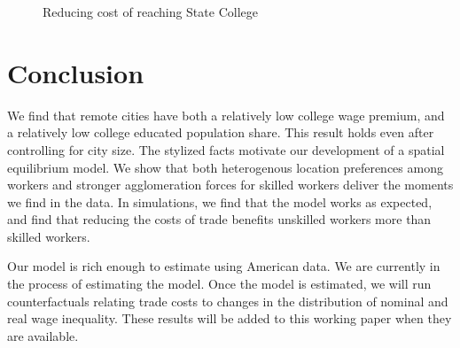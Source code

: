 \documentclass[12 pt]{article}
\begin{document}
\begin{figure}[ht!]

\centering
\caption{\label{fig:sim_res} Reducing cost of reaching State College}
\end{figure}

\section{Conclusion}

We find that remote cities have both a relatively low college wage premium, and a relatively low college educated population share.  This result holds even after controlling for city size.  The stylized facts motivate our development of a spatial equilibrium model.  We show that both heterogenous location preferences among workers and stronger agglomeration forces for skilled workers deliver the moments we find in the data.  In simulations, we find that the model works as expected, and find that reducing the costs of trade benefits unskilled workers more than skilled workers.

Our model is rich enough to estimate using American data.  We are currently in the process of estimating the model.  Once the model is estimated, we will run counterfactuals relating trade costs to changes in the distribution of nominal and real wage inequality.  These results will be added to this working paper when they are available.
\end{document}
